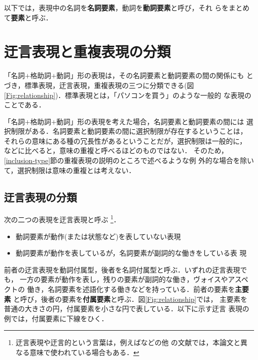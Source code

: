 \documentclass{nlp}
\begin{document}
以下では，表現中の名詞を{\bf 名詞要素}，動詞を{\bf 動詞要素}と呼び，それ
らをまとめて{\bf 要素}と呼ぶ．


\section{迂言表現と重複表現の分類}
「名詞$+$格助詞$+$動詞」形の表現は，その名詞要素と動詞要素の間の関係にも
とづき，標準表現，迂言表現，重複表現の三つに分類できる(図
\ref{Fig:relationship})．標準表現とは，「パソコンを買う」のような一般的
な表現のことである．

「名詞$+$格助詞$+$動詞」形の表現を考えた場合，名詞要素と動詞要素の間には
選択制限がある．名詞要素と動詞要素の間に選択制限が存在するということは，
それらの意味にある種の冗長性があるということだが，選択制限は一般的に，
などに比べると，意味の重複と呼べるほどのものではない．
そのため，\ref{inclusion-type}節の重複表現の説明のところで述べるような例
外的な場合を除いて，選択制限は意味の重複とは考えない．


\begin{figure*}[t]
 \begin{center}
  \caption{「名詞$+$格助詞$+$動詞」形の表現の分類}
  \label{Fig:relationship}
 \end{center}
\end{figure*}


\subsection{迂言表現の分類}
次の二つの表現を迂言表現と呼ぶ
\footnote{迂言表現や迂言的という言葉は，例えば\cite{yamanashi95}などの他
の文献では，本論文と異なる意味で使われている場合もある．}．
\begin{itemize}
 \item 動詞要素が動作(または状態など)を表していない表現
 \item 動詞要素が動作を表しているが，名詞要素が副詞的な働きをしている表
       現
\end{itemize}
前者の迂言表現を動詞付属型，後者を名詞付属型と呼ぶ．いずれの迂言表現でも，
一方の要素が動作を表し，残りの要素が副詞的な働き，ヴォイスやアスペクトの
働き，名詞要素を述語化する働きなどを持っている．前者の要素を{\bf 主要素}
と呼び，後者の要素を{\bf 付属要素}と呼ぶ．図\ref{Fig:relationship}では，
主要素を普通の大きさの円，付属要素を小さな円で表している．以下に示す迂言
表現の例では，付属要素に下線をひく．
\end{document}
